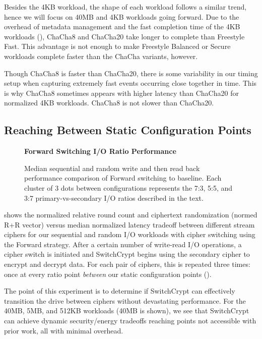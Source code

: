 Besides the 4KB workload, the shape of each workload follows a similar trend,
hence we will focus on 40MB and 4KB workloads going forward. Due to the overhead
of metadata management and the fast completion time of the 4KB workloads
(), ChaCha8 and ChaCha20 take
longer to complete than Freestyle Fast. This advantage is not enough to make
Freestyle Balanced or Secure workloads complete faster than the ChaCha variants,
however.

Though ChaCha8 is faster than ChaCha20, there is some variability in
our timing setup when capturing extremely fast events occurring close together
in time. This is why ChaCha8 sometimes appears with higher latency than ChaCha20
for normalized 4KB workloads. ChaCha8 is not slower than ChaCha20.

\subsection{Reaching Between Static Configuration Points} \label{subsec:2}

\begin{figure}[ht]
  \textbf{Forward Switching I/O Ratio Performance}\par\medskip
  {} \caption{Median sequential and random
  write and then read back performance comparison of Forward switching to
  baseline. Each cluster of 3 dots between configurations represents the 7:3,
  5:5, and 3:7 primary-vs-secondary I/O ratios described in the text.}
 \label{fig:tradeoff-with-ratios}
\end{figure}

 shows the normalized relative round count and
ciphertext randomization (normed R+R vector) versus median normalized latency
tradeoff between different stream ciphers for our sequential and random I/O
workloads with cipher switching using the Forward strategy. After a certain
number of write-read I/O operations, a cipher switch is initiated and
SwitchCrypt begins using the secondary cipher to encrypt and decrypt data. For
each pair of ciphers, this is repeated three times: once at every ratio point
\emph{between} our static configuration points ().

The point of this experiment is to determine if SwitchCrypt can effectively
transition the drive between ciphers without devastating performance. For the
40MB, 5MB, and 512KB workloads (40MB is shown), we see that SwitchCrypt can
achieve dynamic security/energy tradeoffs reaching points not accessible with
prior work, all with minimal overhead.

